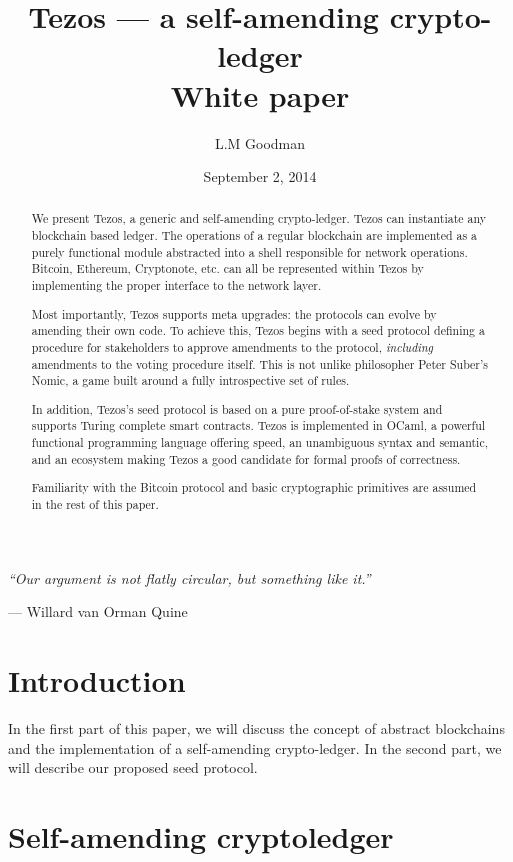 \documentclass[letterpaper]{article}
\author{L.M Goodman}
\date{September 2, 2014}
\title{Tezos --- a self-amending crypto-ledger \\ White paper}
\begin{document}
\maketitle

\epigraph{\emph{``Our argument is not flatly circular,
but something like it.''}}
{--- \textup{Willard van Orman Quine}}


\begin{abstract}
We present Tezos, a generic and self-amending crypto-ledger. Tezos can
instantiate any blockchain based ledger. The operations of a regular blockchain
are implemented as a purely functional module abstracted into a shell
responsible for network operations. Bitcoin, Ethereum, Cryptonote, etc. can all
be represented within Tezos by implementing the proper interface to the network
layer.

Most importantly, Tezos supports meta upgrades: the protocols can evolve by
amending their own code. To achieve this, Tezos begins with a seed protocol
defining a procedure for stakeholders to approve amendments to the protocol,
\emph{including} amendments to the voting procedure itself. This is not unlike
philosopher Peter Suber's Nomic\cite{Nomic}, a game built around a fully
introspective set of rules.

In addition, Tezos's seed protocol is based on a pure proof-of-stake system
and supports Turing complete smart contracts. Tezos is implemented in OCaml,
a powerful functional programming language offering speed, an unambiguous
syntax and semantic, and an ecosystem making Tezos a good candidate for formal
proofs of correctness.

Familiarity with the Bitcoin protocol and basic cryptographic primitives are
assumed in the rest of this paper.

\end{abstract}
\newpage

\tableofcontents
\newpage

\section{Introduction}
In the first part of this paper, we will discuss the concept of abstract
blockchains and the implementation of a self-amending crypto-ledger.
In the second part, we will describe our proposed seed protocol.

\section{Self-amending cryptoledger}
\end{document}
